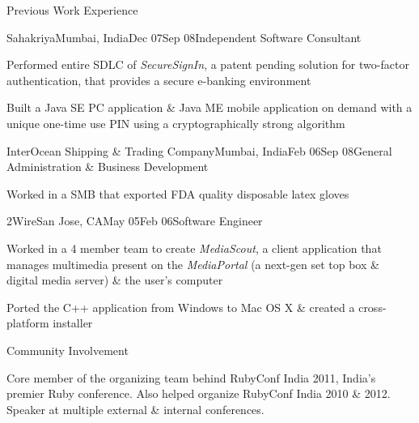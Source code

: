 \documentclass{resume} %
\begin{document}
\begin{rSection}{Previous Work Experience}

\begin{rSubsection}{Sahakriya}{Mumbai, India}{Dec 07}{Sep 08}{Independent Software Consultant}
\item Performed entire SDLC of {\em SecureSignIn}, a patent pending solution for two-factor authentication, that provides a secure e-banking environment
\item Built a Java SE PC application \& Java ME mobile application on demand with a unique one-time use PIN using a cryptographically strong algorithm
\end{rSubsection}


\begin{rSubsection}{InterOcean Shipping \& Trading Company}{Mumbai,
    India}{Feb 06}{Sep 08}{General Administration \& Business Development}
\item Worked in a SMB that exported FDA quality disposable latex gloves
\end{rSubsection}


\begin{rSubsection}{2Wire}{San Jose, CA}{May 05}{Feb 06}{Software Engineer}
\item Worked in a 4 member team to create {\em MediaScout}, a client
  application that manages multimedia present on the {\em MediaPortal}
  (a next-gen set top box \& digital media server) \& the user's computer
\item Ported the C++ application from Windows to Mac OS X \& created a cross-platform installer
\end{rSubsection}

\end{rSection}


\begin{rSection}{Community Involvement}

Core member of the organizing team behind RubyConf India 2011, India's
premier Ruby conference. Also helped organize RubyConf India 2010 \&
2012. Speaker at multiple external \& internal conferences.
\end{rSection}
\end{document}
